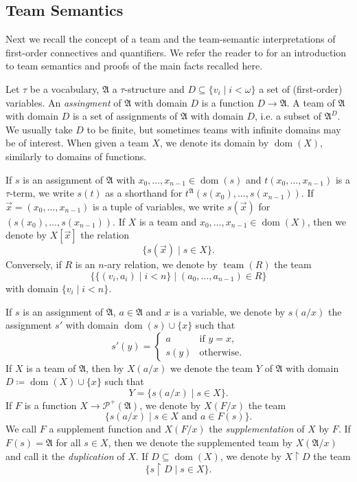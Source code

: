 \documentclass[a4paper]{amsart}
\theoremstyle{definition}
\theoremstyle{remark}
\renewcommand{\restriction}{ {\upharpoonright} }
\newcommand{\A}{\mathcal{A}}
\newcommand{\vx}{\vec{x}}
\DeclareMathOperator{\Pow}{\wp}
\DeclareMathOperator{\dom}{dom}
\DeclareMathOperator{\team}{team}
\theoremstyle{definition}
\renewcommand{\A}{\mathfrak{A}}
\renewcommand{\Pow}{\mathcal{P}}
\begin{document}
\subsection{Team Semantics} Next we recall the concept of a team and the team-semantic interpretations of first-order connectives and quantifiers. We refer the reader to \textcite{Vaananen2007-VNNDLA,galliani2012inclusion,gradel2013dependence} for an introduction to team semantics and proofs of the main facts recalled here.

Let $\tau$ be a vocabulary, $\A$ a $\tau$-structure and $D\subseteq\{v_i \mid i<\omega\}$ a set of (first-order) variables. An \emph{assingment} of $\A$ with domain $D$ is a function $D\to\A$. A team of $\A$ with domain $D$ is a set of assignments of $\A$ with domain $D$, i.e. a subset of $\A^D$. We usually take $D$ to be finite, but sometimes teams with infinite domains may be of interest. When given a team $X$, we denote its domain by $\dom(X)$, similarly to domains of functions.

If $s$ is an assignment of $\A$ with $x_0,\dots,x_{n-1}\in\dom(s)$ and $t(x_0,\dots,x_{n-1})$ is a $\tau$-term, we write $s(t)$ as a shorthand for $t^\A(s(x_0),\dots,s(x_{n-1}))$. If $\vx=(x_0,\dots,x_{n-1})$ is a tuple of variables, we write $s(\vx)$ for $(s(x_0),\dots,s(x_{n-1}))$. If $X$ is a team and $x_0,\dots,x_{n-1}\in\dom(X)$, then we denote by $X[\vx]$ the relation
\[
    \{ s(\vx) \mid s\in X \}.
\]
Conversely, if $R$ is an $n$-ary relation, we denote by $\team(R)$ the team
\[
    \{ \{ (v_i, a_i) \mid i<n \} \mid (a_0,\dots,a_{n-1})\in R \}
\]
with domain $\{v_i \mid i<n\}$.

If $s$ is an assignment of $\A$, $a\in\A$ and $x$ is a variable, we denote by $s(a/x)$ the assignment $s'$ with domain $\dom(s)\cup\{x\}$ such that
\[
    s'(y) =
    \begin{cases}
        a & \text{if $y = x$}, \\
        s(y) & \text{otherwise}.
    \end{cases}
\]
If $X$ is a team of $\A$, then by $X(a/x)$ we denote the team $Y$ of $\A$ with domain $D\coloneqq \dom(X)\cup\{x\}$ such that
\[
    Y = \{ s(a/x) \mid s\in X \}.
\]
If $F$ is a function $X\to\Pow^+(\A)$, we denote by $X(F/x)$ the team
\[
    \{ s(a/x) \mid \text{$s\in X$ and $a\in F(s)$} \}.
\]
We call $F$ a supplement function and $X(F/x)$ the \emph{supplementation} of $X$ by $F$. If $F(s) = \A$ for all $s\in X$, then we denote the supplemented team by $X(\A/x)$ and call it the \emph{duplication} of $X$. If $D\subseteq\dom(X)$, we denote by $X\restriction D$ the team
\[
    \{s\restriction D \mid s\in X\}.
\]
\end{document}
